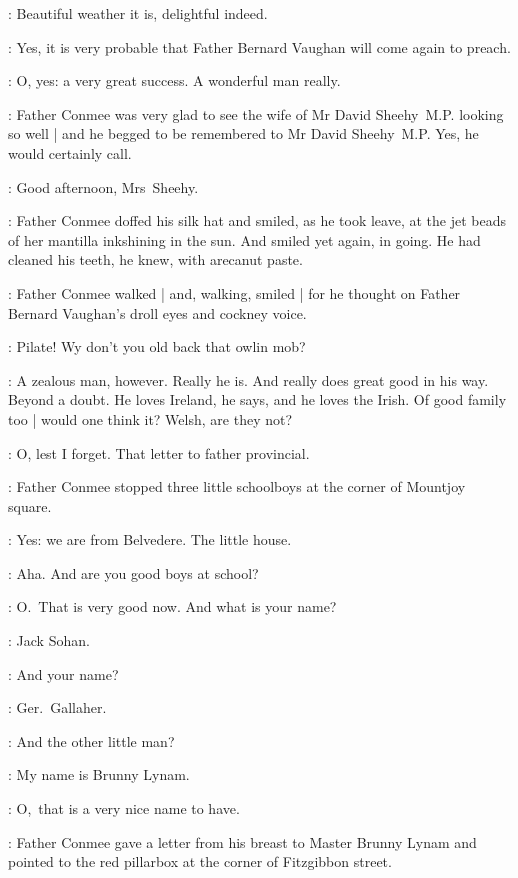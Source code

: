 \mrssheehy:
Beautiful weather it is, delightful indeed.

\conmee:
Yes, it is very probable that Father Bernard Vaughan will come again to preach.

\conmee:
O, yes: a very great success.
A wonderful man really.

:
Father Conmee was very glad 
to see the wife of Mr David Sheehy~M.P. looking so well |
and he begged to be remembered to Mr David Sheehy~M.P.
Yes, he would certainly call.

\conmee:
Good afternoon, Mrs~Sheehy.


:
Father Conmee doffed his silk hat and smiled,
as he took leave,
at the jet beads of her mantilla inkshining in the sun.
And smiled yet again, in going.
He had cleaned his teeth, he knew, with arecanut paste.

:
Father Conmee walked |
and, walking, smiled |
for he thought on
Father Bernard Vaughan's droll eyes and cockney voice.

\conmeeint: 
Pilate!
Wy don't you old back that owlin mob?

\conmeeint:
A zealous man, however.
Really he is.
And really does great good in his way.
Beyond a doubt.
He loves Ireland, he says, and he loves the Irish.
Of good family too |
would one think it?
Welsh, are they not?

\conmeeint:
O, lest I forget.
That letter to father provincial.

:
Father Conmee stopped three little schoolboys
at the corner of Mountjoy square.

\Boys:
Yes: we are from Belvedere.
The little house.

\conmee:
Aha.
And are you good boys at school?

\conmee:
O.~That is very good now.
And what is your name?

:
Jack Sohan.

\conmee:
And your name?

:
Ger.~Gallaher.

\conmee:
And the other little man?

:
My name is Brunny Lynam.

\conmee:
O,~that is a very nice name to have.

:
Father Conmee gave a letter from his breast to Master Brunny Lynam
and pointed to the red pillarbox at the corner of Fitzgibbon street.

